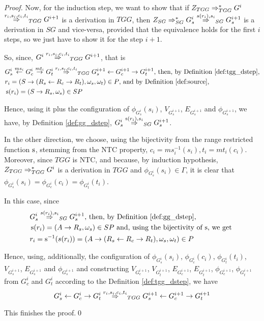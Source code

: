 \documentclass[runningheads]{llncs}
\begin{document}
\begin{proof}
	Now, for the induction step, we want to show that if $Z_{TGG} \Rightarrow^*_{TGG} G^i$ $\tderiv{r_{i}}{s_{i},c_{i},t_{i}}{TGG} G^{i+1}$ is a derivation in $TGG$, then $\startG{SG} \derivtr{SG} G^i_s \deriv{s(r_{i})}{s_{i}}{SG} G^{i+1}_s$ is a derivation in $SG$ and vice-versa, provided that the equivalence holds for the first $i$ steps, so we just have to show it for the step $i+1$.
	
	So, since, $G^i \tderiv{r_{i}}{s_{i},c_{i},t_{i}}{TGG} G^{i+1}$, that is
	\begin{align*}
		& G^i_s \ms{ms_i} G^i_c \mt{mt_i} G^i_t \tderiv{r_i}{s_i,c_i,t_i}{TGG} G^{i+1}_s \ms{} G^{i+1}_c \mt{} G^{i+1}_t \text{, then, by Definition \ref{def:tgg_dstep},}\\
		& r_i = (S \pro (R_s \ms{} R_c \mt{} R_t), \omega_s, \omega_t) \in P \text{, and by Definition \ref{def:source},}\\
		& \source(r_i) = (S \pro R_s, \omega_s) \in SP
	\end{align*}
	
	Hence, using it plus the configuration of $\phi_{G^i_s}(s_i)$, $V_{G^{i+1}_s}$, $E_{G^{i+1}_s}$ and $\phi_{G^{i+1}_s}$, we have, by Definition \ref{def:gg_dstep}, $G_s^i \deriv{\source(r_i)}{s_i}{SG} G^{i+1}_s$.
	
	In the other direction, we choose, using the bijectivity from the range restricted function $\operatorname{s}$, stemming from the NTC property, $c_i = ms_i^{-1}(s_i), t_i = mt_i(c_i)$. Moreover, since $TGG$ is NTC, and because, by induction hypothesis, $Z_{TGG} \Rightarrow^*_{TGG} G^i$ is a derivation in $TGG$ and $\phi_{G^i_s}(s_i) \in \Gamma$, it is clear that $\phi_{G^i_s}(s_i) = \phi_{G^i_c}(c_i) = \phi_{G^i_t}(t_i)$.
	
	In this case, since
	\begin{align*}
		& G^{i}_s \deriv{s(r_i)}{s_i}{SG} G^{i+1}_s \text{, then, by Definition \ref{def:gg_dstep},}\\
		& \source(r_i) = (A \pro R_s, \omega_s) \in SP \text{ and, using the bijectivity of $\source$, we get }\\
		& r_i = \source^{-1}(s(r_i)) = (A \pro (R_s \ms{} R_c \mt{} R_t), \omega_s, \omega_t) \in P
	\end{align*} 
	
	Hence, using, additionally, the configuration of $\phi_{G^i_s}(s_i)$, $\phi_{G^i_c}(c_i)$, $\phi_{G^i_t}(t_i)$, $V_{G^{i+1}_s}$, $E_{G^{i+1}_s}$ and $\phi_{G^{i+1}_s}$ and constructing $V_{G^{i+1}_c}$, $V_{G^{i+1}_t}$, $E_{G^{i+1}_c}$, $E_{G^{i+1}_t}$, $\phi_{G^{i+1}_c}$, $\phi_{G^{i+1}_t}$ from $G^i_c$ and $G^i_t$ according to the Definition \ref{def:tgg_dstep}, we have 
	\begin{equation*}
		G^i_s \ms{} G^i_c \mt{} G^i_t \tderiv{r_i}{s_i,c_i,t_i}{TGG} G^{i+1}_s \ms{} G^{i+1}_c \mt{} G^{i+1}_t
	\end{equation*}
	
	This finishes the proof.\qed
\end{proof}
\end{document}
